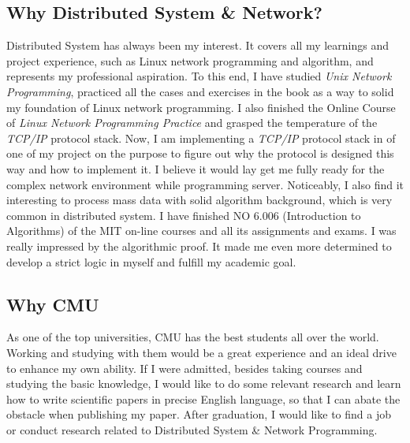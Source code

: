 \documentclass{article}
\begin{document}
\begin{multicols}{2}
		\subsection{Why Distributed System \& Network?}
		Distributed System has always been my interest. It covers all my learnings and project experience, such as Linux network programming and algorithm, and represents my professional aspiration. To this end, I have studied \textit{Unix Network Programming}, practiced all the cases and exercises in the book as a way to solid my foundation of Linux network programming. I also finished the Online Course of \textit{Linux Network Programming Practice} and grasped the temperature of the \textit{TCP/IP} protocol stack. Now, I am implementing a \textit{TCP/IP} protocol stack in of one of my project on the purpose to figure out why the protocol is designed this way and how to implement it. I believe it would lay get me fully ready for the complex network environment while programming server.
		Noticeably, I also find it interesting to process mass data with solid algorithm background, which is very common in distributed system. I have finished NO 6.006 (Introduction to Algorithms) of the MIT on-line courses and all its assignments and exams. I was really impressed by the algorithmic proof. It made me even more determined to develop a strict logic in myself and fulfill my academic goal.
		\subsection{Why CMU}
		As one of the top universities, CMU has the best students all over the world. Working and studying with them would be a great experience and an ideal drive to enhance my own ability.
		If I were admitted, besides taking courses and studying the basic knowledge, I would like to do some relevant research and learn how to write scientific papers in precise English language, so that I can abate the obstacle when publishing my paper.
		After graduation, I would like to find a job or conduct research related to Distributed System \& Network Programming.
	\end{multicols}
\end{document}
